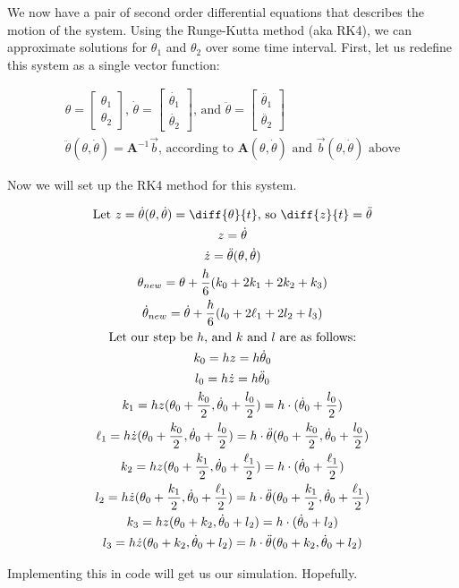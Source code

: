 \documentclass[]{article}
\begin{document}
We now have a pair of second order differential equations that describes the motion of the system. Using the Runge-Kutta method (aka RK4), we can approximate solutions for $\theta_1$ and $\theta_2$ over some time interval. First, let us redefine this system as a single vector function:

\begin{gather*}
	\theta = 
	\begin{bmatrix}
		\theta_1 \\
		\theta_2
	\end{bmatrix} \text{, }
	\dot{\theta} = 
	\begin{bmatrix}
		\dot{\theta_1} \\
		\dot{\theta_2}
	\end{bmatrix} \text{, and }
	\ddot{\theta} =
	\begin{bmatrix}
		\ddot{\theta_1} \\
		\ddot{\theta_2}
	\end{bmatrix} \\
	\ddot{\theta}(\theta, \dot{\theta}) = \boldsymbol{A}^{-1}\vec{b}\text{, according to $\boldsymbol{A}(\theta, \dot{\theta})$ and $\vec{b}(\theta, \dot{\theta})$ above}
\end{gather*}

Now we will set up the RK4 method for this system.

\begin{gather*}
	\text{Let } z = \dot{\theta}(\theta, \dot{\theta}) = \diff{\theta}{t} \text{, so } \diff{z}{t} = \ddot{\theta} \\
	z = \dot{\theta} \\
	\dot{z} = \ddot{\theta}(\theta, \dot{\theta}) \\
	\theta_{new} = \theta + \frac{h}{6}(k_0 + 2k_1 + 2k_2 + k_3) \\
	\dot{\theta}_{new} = \dot{\theta} + \frac{h}{6}(l_0 + 2\ell_1 + 2l_2 + l_3) \\
	\text{Let our step be $h$, and $k$ and $l$ are as follows:}\\
	k_0 = hz = h\dot{\theta}_0 \\
	l_0 = h\dot{z} = h\ddot{\theta}_0 \\
	k_1 = hz(\theta_0 + \frac{k_0}{2}, \dot{\theta}_0 + \frac{l_0}{2}) = h\cdot(\dot{\theta}_0 + \frac{l_0}{2}) \\
	\ell_1 = h\dot{z}(\theta_0 + \frac{k_0}{2}, \dot{\theta}_0 + \frac{l_0}{2}) = h\cdot\ddot{\theta}(\theta_0 + \frac{k_0}{2}, \dot{\theta}_0 + \frac{l_0}{2}) \\
	k_2 = hz(\theta_0 + \frac{k_1}{2}, \dot{\theta}_0 + \frac{\ell_1}{2}) = h\cdot(\dot{\theta}_0 + \frac{\ell_1}{2}) \\
	l_2 = h\dot{z}(\theta_0 + \frac{k_1}{2}, \dot{\theta}_0 + \frac{\ell_1}{2}) = h\cdot\ddot{\theta}(\theta_0 + \frac{k_1}{2}, \dot{\theta}_0 + \frac{\ell_1}{2}) \\
	k_3 = hz(\theta_0 + k_2, \dot{\theta}_0 + l_2) = h\cdot(\dot{\theta}_0 + l_2) \\
	l_3 = h\dot{z}(\theta_0 + k_2, \dot{\theta}_0 + l_2) = h\cdot\ddot{\theta}(\theta_0 + k_2, \dot{\theta}_0 + l_2)
\end{gather*}

Implementing this in code will get us our simulation. Hopefully.
\end{document}
